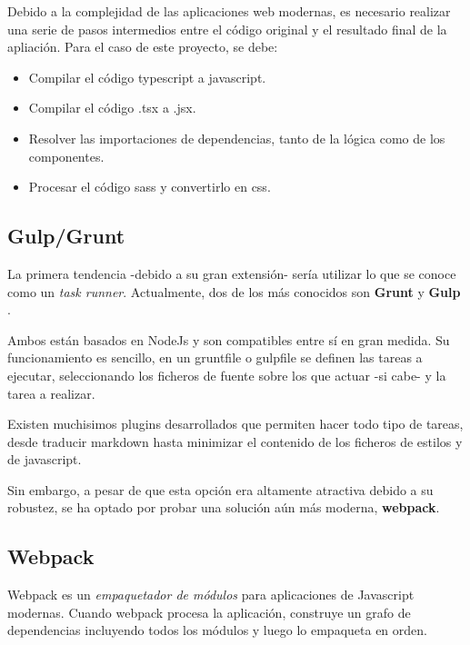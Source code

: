 Debido a la complejidad de las aplicaciones web modernas, es necesario 
realizar una serie de pasos intermedios entre el código original y 
el resultado final de la apliación. Para el caso de este proyecto, se debe:

\begin{itemize}

\item Compilar el código typescript a javascript.

\item Compilar el código .tsx a .jsx.

\item Resolver las importaciones de dependencias, tanto de la lógica
como de los componentes.

\item Procesar el código sass y convertirlo en css.

\end{itemize}

\subsection{Gulp/Grunt}

La primera tendencia -debido a su gran extensión- sería utilizar 
lo que se conoce como un \textit{task runner}. Actualmente, dos de los 
más conocidos son \textbf{Grunt} \cite{grunt} y  \textbf{Gulp} \cite{gulp}.

\bigskip
Ambos están basados en NodeJs y son compatibles entre sí en gran medida.
Su funcionamiento es sencillo, en un gruntfile o gulpfile se definen las tareas a
ejecutar, seleccionando los ficheros de fuente sobre los que actuar -si cabe- y la tarea 
a realizar.

\bigskip
Existen muchisimos plugins desarrollados que permiten hacer todo tipo de tareas, desde traducir
markdown hasta minimizar el contenido de los ficheros de estilos y de javascript.

\bigskip
Sin embargo, a pesar de que esta opción era altamente atractiva debido 
a su robustez, se ha optado por probar una solución aún más moderna, \textbf{webpack}.

\subsection{Webpack}

Webpack es un \textit{empaquetador de módulos} para aplicaciones de Javascript modernas.
Cuando webpack procesa la aplicación, construye un grafo de dependencias
incluyendo todos los módulos y luego lo empaqueta en orden. \cite{webpack} 

